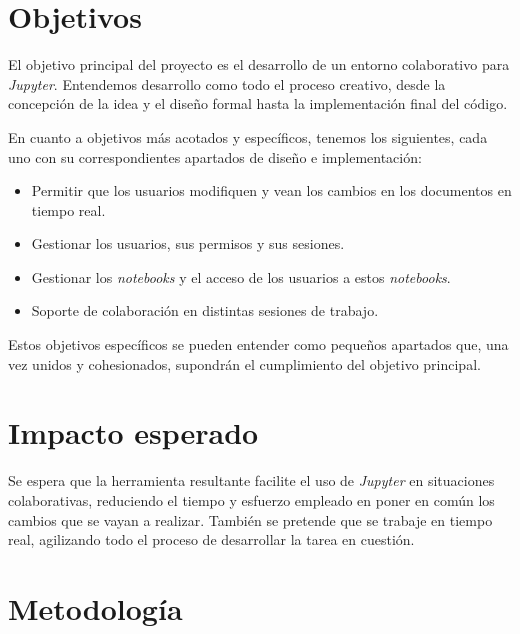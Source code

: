 \documentclass[11pt,spanish,listoffigures]{tfgetsinf}
\begin{document}

\section{Objetivos}
\label{sec:objetivos}

El objetivo principal del proyecto es el desarrollo de un entorno colaborativo para \textit{Jupyter}. Entendemos desarrollo como todo el proceso creativo, desde la concepción de la idea y el diseño formal hasta la implementación final del código.

En cuanto a objetivos más acotados y específicos, tenemos los siguientes, cada uno con su correspondientes apartados de diseño e implementación:

\begin{itemize}

\item Permitir que los usuarios modifiquen y vean los cambios en los documentos en tiempo real.

\item Gestionar los usuarios, sus permisos y sus sesiones.

\item Gestionar los \textit{notebooks} y el acceso de los usuarios a estos \textit{notebooks}.

\item Soporte de colaboración en distintas sesiones de trabajo.

\end{itemize}

Estos objetivos específicos se pueden entender como pequeños apartados que, una vez unidos y cohesionados, supondrán el cumplimiento del objetivo principal.



\section{Impacto esperado}
\label{sec:impacto}

Se espera que la herramienta resultante facilite el uso de \textit{Jupyter} en situaciones colaborativas, reduciendo el tiempo y esfuerzo empleado en poner en común los cambios que se vayan a realizar. También se pretende que se trabaje en tiempo real, agilizando todo el proceso de desarrollar la tarea en cuestión. 



\section{Metodología}
\label{sec:metodologia}
\end{document}
